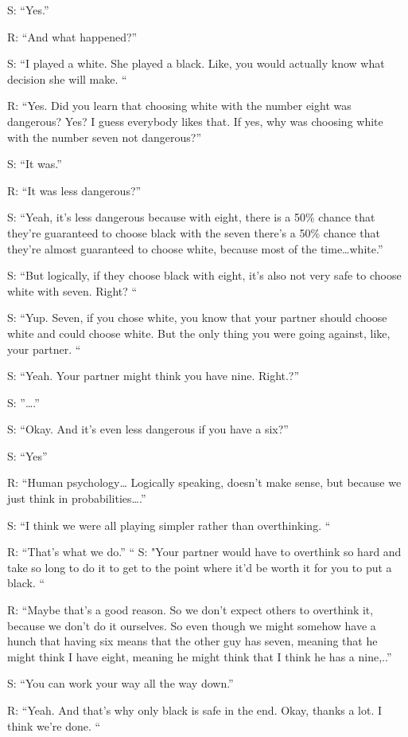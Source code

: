S: “Yes.”

R: “And what happened?”

S: “I played a white. She played a black. Like, you would actually know what decision she will make. “

R: “Yes. Did you learn that choosing white with the number eight was dangerous? Yes? I guess everybody likes that. If yes, why was choosing white with the number seven not dangerous?”

S: “It was.”

R: “It was less dangerous?”

S: “Yeah, it's less dangerous because with eight, there is a 50\% chance that they're guaranteed to choose black with the seven there's a 50\% chance that they're almost guaranteed to choose white, because most of the time…white.”

S: “But logically, if they choose black with eight, it's also not very safe to choose white with seven. Right? “

S: “Yup. Seven, if you chose white, you know that your partner should choose white and could choose white. But the only thing you were going against, like, your partner. “

S: “Yeah. Your partner might think you have nine. Right.?”

S: ”….”

S: “Okay. And it's even less dangerous if you have a six?”

S: “Yes”

R: “Human psychology… Logically speaking, doesn't make sense, but because we just think in probabilities….”

S: “I think we were all playing simpler rather than overthinking. “

R: “That's what we do.” 
“
S: "Your partner would have to overthink so hard and take so long to do it to get to the point where it'd be worth it for you to put a black. “

R: “Maybe that's a good reason. So we don't expect others to overthink it, because we don't do it ourselves. So even though we might somehow have a hunch that having six means that the other guy has seven, meaning that he might think I have eight, meaning he might think that I think he has a nine,..”

S: “You can work your way all the way down.”

R: “Yeah. And that's why only black is safe in the end. Okay, thanks a lot. I think we're done. “




